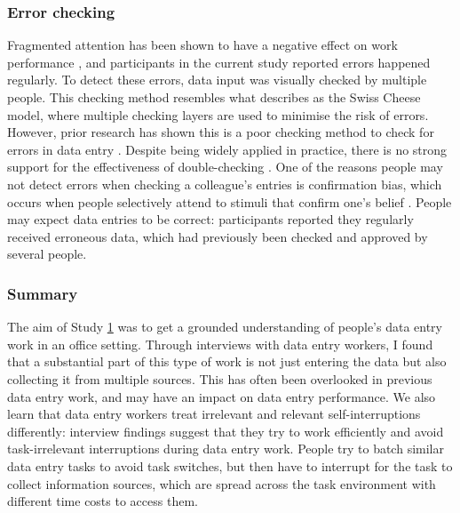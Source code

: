 \subsubsection{Error checking}
Fragmented attention has been shown to have a negative effect on work performance \citep{Bailey2001, Carrier2015}, and participants in the current study reported errors happened regularly. To detect these errors, data input was visually checked by multiple people. This checking method resembles what \citet{Reason1990} describes as the Swiss Cheese model, where multiple checking layers are used to minimise the risk of errors. However, prior research has shown this is a poor checking method to check for errors in data entry \citep{Olsen2008, Wiseman2013a}. Despite being widely applied in practice, there is no strong support for the effectiveness of double-checking \citep{Li2016}. One of the reasons people may not detect errors when checking a colleague's entries is confirmation bias, which occurs when people selectively attend to stimuli that confirm one's belief \citep{Lewis1986}. People may expect data entries to be correct: participants reported they regularly received erroneous data, which had previously been checked and approved by several people. 


\subsubsection{Summary}
The aim of Study \hyperref[st:Study1]{1}  was to get a grounded understanding of people's data entry work in an office setting. Through interviews with data entry workers, I found that a substantial part of this type of work is not just entering the data but also collecting it from multiple sources. This has often been overlooked in previous data entry work, and may have an impact on data entry performance. We also learn that data entry workers treat irrelevant and relevant self-interruptions differently: interview findings suggest that they try to work efficiently and avoid task-irrelevant interruptions during data entry work. People try to batch similar data entry tasks to avoid task switches, but then have to interrupt for the task to collect information sources, which are spread across the task environment with different time costs to access them. 

